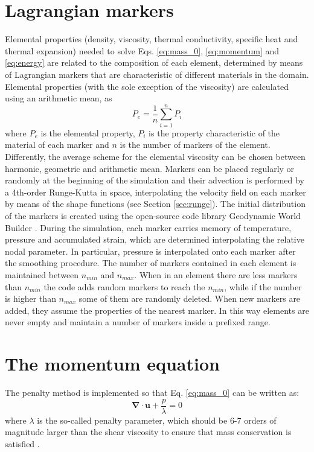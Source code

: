 \documentclass[hidelinks,10pt,a4paper]{article}
\begin{document}
\section{Lagrangian markers}\label{sec:markers}
Elemental properties (density, viscosity, thermal conductivity, specific heat and thermal expansion) needed to solve Eqs. \ref{eq:mass_0}, \ref{eq:momentum}
and \ref{eq:energy} are related to the composition of each element, determined by means of Lagrangian markers that are characteristic of different materials
in the domain. Elemental properties (with the sole exception of the viscosity) are calculated using an arithmetic mean, as \[P_e=\frac{1}{n}\sum_{i=1}^n P_i\]
where $P_e$ is the elemental property, $P_i$ is the property characteristic of the material of each marker and $n$ is the number of markers of the element.
Differently, the average scheme for the elemental viscosity can be chosen between harmonic, geometric and arithmetic mean. Markers can be placed regularly or
randomly at the beginning of the simulation and their advection is performed by a 4th-order Runge-Kutta in space, interpolating the velocity field on each
marker by means of the shape functions (see Section \ref{sec:runge}). The initial distribution of the markers is created using the open-source code library
Geodynamic World Builder \citep{Fraters2019}. During the simulation, each marker carries memory of temperature, pressure and accumulated strain, which are
determined interpolating the relative nodal parameter. In particular, pressure is interpolated onto each marker after the smoothing procedure. The number
of markers contained in each element is maintained between $n_{min}$ and $n_{max}$. When in an element there are less markers than $n_{min}$ the code adds
random markers to reach the $n_{min}$, while if the number is higher than $n_{max}$ some of them are randomly deleted. When new markers are added, they assume
the properties of the nearest marker. In this way elements are never empty and maintain a number of markers inside a prefixed range.

\section{The momentum equation}\label{sec:mom_eq}
The penalty method is implemented so that Eq. \ref{eq:mass_0} can be written as:
\begin{equation}\label{eq:mass_penalty}
\bm{\nabla} \cdot \bm{u} + \frac{p}{\lambda}=0
\end{equation}
where $\lambda$ is the so-called penalty parameter, which should be 6-7 orders of magnitude larger than the shear viscosity to ensure that mass conservation
is satisfied \citep{Donea2003,Thieulot2014}.
\end{document}
